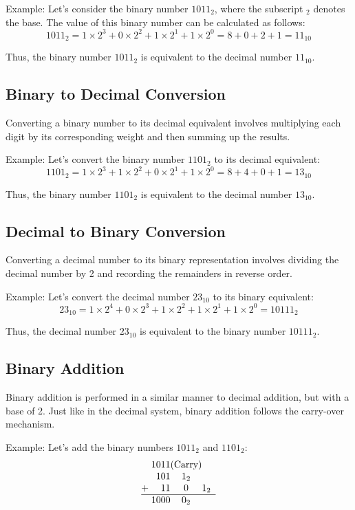 \documentclass{article}
\begin{document}
Example: Let's consider the binary number $1011_2$, where the subscript $_2$ denotes the base. The value of this binary number can be calculated as follows:
\[ 1011_2 = 1 \times 2^3 + 0 \times 2^2 + 1 \times 2^1 + 1 \times 2^0 = 8 + 0 + 2 + 1 = 11_{10} \]

Thus, the binary number $1011_2$ is equivalent to the decimal number $11_{10}$.

\subsection{Binary to Decimal Conversion}

Converting a binary number to its decimal equivalent involves multiplying each digit by its corresponding weight and then summing up the results.

Example: Let's convert the binary number $1101_2$ to its decimal equivalent:
\[ 1101_2 = 1 \times 2^3 + 1 \times 2^2 + 0 \times 2^1 + 1 \times 2^0 = 8 + 4 + 0 + 1 = 13_{10} \]

Thus, the binary number $1101_2$ is equivalent to the decimal number $13_{10}$.

\subsection{Decimal to Binary Conversion}

Converting a decimal number to its binary representation involves dividing the decimal number by 2 and recording the remainders in reverse order.

Example: Let's convert the decimal number $23_{10}$ to its binary equivalent:
\[ 23_{10} = 1 \times 2^4 + 0 \times 2^3 + 1 \times 2^2 + 1 \times 2^1 + 1 \times 2^0 = 10111_2 \]

Thus, the decimal number $23_{10}$ is equivalent to the binary number $10111_2$.

\subsection{Binary Addition}

Binary addition is performed in a similar manner to decimal addition, but with a base of 2. Just like in the decimal system, binary addition follows the carry-over mechanism.

Example: Let's add the binary numbers $1011_2$ and $1101_2$:
\[
\begin{array}{@{}c@{\;}c@{}c@{}c@{}c@{}c@{}c}
  & 1 & 0 & 1 & 1 & \text{(Carry)} \\
  & & 1 & 0 & 1 & 1_2 \\
+ & & & 1 & 1 & 0 & 1_2 \\
\hline
  & 1 & 0 & 0 & 0 & 0_2 \\
\end{array}
\]
\end{document}
